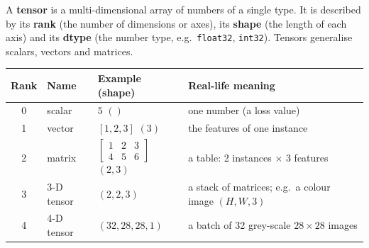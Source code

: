 \begin{definition}[: Tensor]
A \textbf{tensor} is a multi-dimensional array of numbers of a single type. It is described by its \textbf{rank} (the number of dimensions or axes), its \textbf{shape} (the length of each axis) and its \textbf{dtype} (the number type, e.g.\ \texttt{float32}, \texttt{int32}). Tensors generalise scalars, vectors and matrices.
\end{definition}

\begin{center}
\begin{tabular}{@{}cllp{5cm}@{}}
\toprule
\textbf{Rank} & \textbf{Name} & \textbf{Example (shape)} & \textbf{Real-life meaning}\\
\midrule
0 & scalar & $5$ \quad $()$ & one number (a loss value)\\
1 & vector & $[1,2,3]$ \quad $(3)$ & the features of one instance\\
2 & matrix & $\begin{bmatrix}1&2&3\\4&5&6\end{bmatrix}$ \quad $(2,3)$ & a table: 2 instances $\times$ 3 features\\
3 & 3-D tensor & $(2,2,3)$ & a stack of matrices; e.g.\ a colour image $(H,W,3)$\\
4 & 4-D tensor & $(32,28,28,1)$ & a batch of 32 grey-scale $28\times28$ images\\
\bottomrule
\end{tabular}
\end{center}


